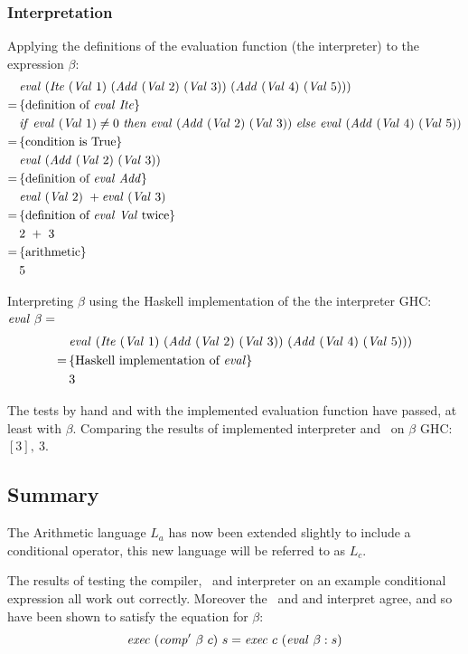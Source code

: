\documentclass {article}
\begin{document}
\subsubsection{Interpretation}

Applying the definitions of the evaluation function (the interpreter) to the expression $\beta$:
\begin{align*}
	&\evalf  (\Ite (\Val 1)\ 
	(\Add (\Val 2)\ (\Val 3))\ (\Add (\Val 4)\ (\Val 5))) \\
	=\, & \{ \mbox{definition of \eval\ \ite} \} \\
	&\ifff \evalf (\Val 1) \not= 0\ 
		\tthen \evalf (\Add (\Val 2)\ (\Val 3))\
		 \eelse  \evalf (\Add (\Val 4)\ (\Val 5))  \\
	=\, & \{ \mbox{condition is True} \} \\
	&\evalf (\Add (\Val 2)\ (\Val 3)) \\
	=\, & \{ \mbox{definition of \eval\ \add} \} \\
	&\evalf (\Val 2)\ + \evalf (\Val 3) \\
	=\, & \{ \mbox{definition of \eval\ \val\ twice} \} \\
	&2\ +\ 3 \\
	=\, & \{ \mbox{arithmetic} \} \\
	&5
\end{align*}

Interpreting $\beta$ 
using the Haskell implementation of the the interpreter
GHC: \( \mathit{eval\ } \beta = \)
\begin{align*}
&\evalf (\Ite (\Val 1)\ 
	(\Add (\Val 2)\ (\Val 3))\ (\Add (\Val 4)\ (\Val 5))) \\
=\, & \{ \mbox{Haskell implementation of \eval} \} \\
&3
\end{align*}

The tests by hand and with the implemented evaluation function
have passed, at least with $\beta$.
Comparing the results of  
implemented interpreter and \vm\ on $\beta$
GHC: \( [3],\ 3 \).

\subsection{Summary}

The Arithmetic language $L_a$ has now been extended slightly
to include a conditional operator, this new language will be
referred to as $L_c$.

The results of testing the compiler, \vm\ and interpreter on 
an example conditional expression all work out correctly.
Moreover the \vm\ and and interpret agree, and so
have been shown to satisfy the equation for $\beta$:
\[ \Exec (\Compp \beta\ c)\ s = \Exec c\ (\evalf \beta : s) \]
\end{document}
